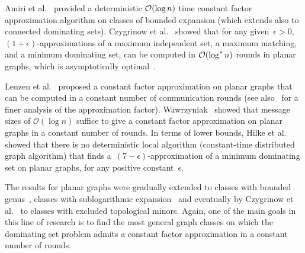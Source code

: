 Amiri et al.~\cite{akhoondian2018distributed} provided a deterministic
$\mathcal{O}(\log n)$ time constant factor approximation algorithm on
classes of bounded expansion (which extends also to connected
dominating sets).
Czygrinow et al.~\cite{czygrinow2008fast} showed
that for any given~\mbox{$\epsilon>0$}, $(1+\epsilon)$-approximations of a maximum independent
set, a maximum matching, and a minimum dominating set, can be computed in
$\mathcal{O}(\log^* n)$ rounds in planar graphs, which is asymptotically optimal~\cite{lenzen2008leveraging}.

Lenzen et al.~\cite{lenzen2013distributed} proposed a constant factor
approximation on planar graphs that can be computed in a
constant number of communication rounds (see also~\cite{wawrzyniak2014strengthened}
for a finer analysis of the approximation factor).
Wawrzyniak~\cite{wawrzyniak2013brief} showed
that message sizes of $\mathcal{O}(\log n)$ suffice to give a
constant factor approximation on planar graphs in a constant number
of rounds.
In terms of lower bounds, Hilke et al.~\cite{hilke2014brief} showed that there is no
deterministic local algorithm (constant-time distributed graph algorithm) that
finds a~$(7-\epsilon)$-approximation of a minimum dominating set on
planar graphs, for any positive constant~$\epsilon$.

The results for planar
graphs were gradually extended to classes with bounded genus~\cite{akhoondian2016local,amiri2016brief}, classes with sublogarithmic expansion~\cite{amiri2019distributed} and eventually by Czygrinow et al.~\cite{czygrinow2018distributed} to classes with excluded topological minors.
Again, one of the main goals in this line of research is to find the most general
graph classes on which the dominating set problem admits a constant
factor approximation in a constant number of rounds.


